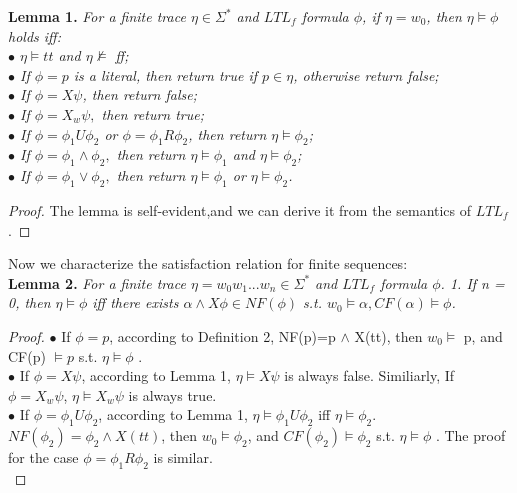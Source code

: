 {\bf Lemma 1.}  {\it For a finite trace $\eta \in \Sigma^{*}$ and $LTL_f$ formula $\phi$, if $\eta = w_0$, then $\eta \models \phi$ holds iff: \\ 
$\bullet$ $\eta \models tt$ and $\eta \not \models $ ff;\\
$\bullet$ If $\phi=p$ is a literal, then return true if $p \in \eta$, otherwise return false;\\
$\bullet$ If $\phi=X \psi$, then return false;\\
$\bullet$ If $\phi=X_{w} \psi,$ then return true;\\
$\bullet$ If $\phi=\phi_{1} U \phi_{2}$ or  $\phi=\phi_{1} R \phi_{2}$, then return  $\eta \models \phi_{2}$; \\
$\bullet$ If $\phi=\phi_{1} \wedge \phi_{2},$ then return $\eta \models \phi_{1}$ and $\eta \models \phi_{2}$; \\
$\bullet$ If $\phi=\phi_{1} \vee \phi_{2},$ then return $\eta \models \phi_{1}$ or $\eta \models \phi_{2}$.\\}

\begin{proof}
The lemma is self-evident,and we can derive it from the semantics of $LTL_f$.
\end{proof}

Now we characterize the satisfaction relation for finite sequences: \\
{\bf Lemma 2.}  {\it For a finite trace $\eta = w_0w_1...w_n \in \Sigma^{*}$ and $LTL_f$ formula $\phi$.
1. If n = 0, then $\eta \models \phi$ iff there exists $ \alpha \wedge X\phi \in NF(\phi)$ s.t. $w_0 \models \alpha, CF(\alpha)\models \phi$.
}
\begin{proof}
$\bullet$ If $\phi = p$, according to Definition 2, NF(p)=p $\wedge$ X(tt), then $w_0 \models$ p, and CF(p) $\models p$ s.t. $\eta \models \phi$ .\\
$\bullet$ If $\phi=X \psi$, according to Lemma 1, $\eta \models X \psi$ is always false. Similiarly, If $\phi=X_{w} \psi$, $\eta \models X_{w} \psi$ is always true.\\
$\bullet$ If $\phi=\phi_{1} U \phi_{2}$, according to Lemma 1, $\eta \models \phi_{1} U \phi_{2}$ iff $\eta \models \phi_{2}$.$NF(\phi_{2})=\phi_{2} \wedge X(tt)$, then  $w_0 \models \phi_{2}$, and $CF(\phi_{2}) \models \phi_{2}$ s.t. $\eta \models \phi$ . The proof for the case $\phi=\phi_{1} R \phi_{2}$ is similar. \\




\end{proof}
        
